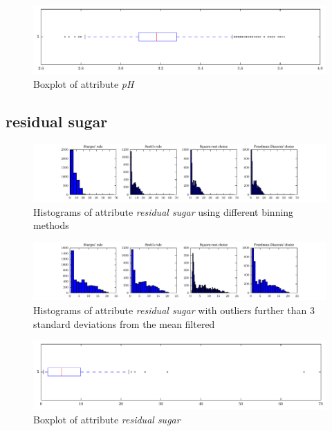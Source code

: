 \documentclass{report}
\begin{document}
\begin{figure}[H]
\includegraphics[width=\textwidth]{boxplots/pH.pdf}
\caption{Boxplot of attribute \emph{pH}}\end{figure}

\newpage\subsection{residual sugar}
\begin{figure}[H]
\includegraphics[width=\textwidth]{histograms/residual_sugar.pdf}
\caption{Histograms of attribute \emph{residual sugar} using different binning methods}\end{figure}

\begin{figure}[H]
\includegraphics[width=\textwidth]{histograms/residual_sugar_filtered.pdf}
\caption{Histograms of attribute \emph{residual sugar} with outliers further than 3 standard deviations from the mean filtered}
\end{figure}

\begin{figure}[H]
\includegraphics[width=\textwidth]{boxplots/residual_sugar.pdf}
\caption{Boxplot of attribute \emph{residual sugar}}\end{figure}
\end{document}
